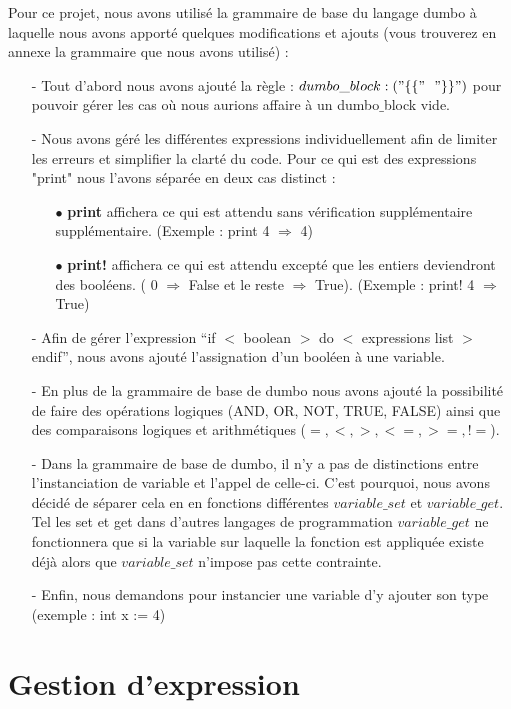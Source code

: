 \documentclass[a4paper, 12pt]{article}
\begin{document}
Pour ce projet, nous avons utilisé la grammaire de base du langage dumbo à laquelle nous avons apporté quelques modifications et ajouts (vous trouverez en annexe la grammaire que nous avons utilisé) : \begin{itemize}
	\item[-] Tout d'abord nous avons ajouté la règle : $dumbo\_block: ( "\{\{"\ \ "\}\}" )$ pour pouvoir gérer les cas où nous aurions affaire à un dumbo$\_$block vide.
	\item[-] Nous avons géré les différentes expressions individuellement afin de limiter les erreurs et simplifier la clarté du code. Pour ce qui est des expressions "print" nous l'avons séparée en deux cas distinct :\begin{itemize}
		\item[$\bullet$] \textbf{print} affichera ce qui est attendu sans vérification supplémentaire supplémentaire. (Exemple : print 4 $\Rightarrow$ 4)
		\item[$\bullet$] \textbf{print!} affichera ce qui est attendu excepté que les entiers deviendront des booléens. ( 0 $\Rightarrow$ False et le reste $\Rightarrow$ True). (Exemple : print! 4 $\Rightarrow$ True)	
	\end{itemize}
	\item[-] Afin de gérer l'expression “if $<$ boolean $>$ do $<$ expressions list $>$ endif”, nous avons ajouté l'assignation d'un booléen à une variable.
	\item[-] En plus de la grammaire de base de dumbo nous avons ajouté la possibilité de faire des opérations logiques (AND, OR, NOT, TRUE, FALSE) ainsi que des comparaisons logiques et arithmétiques ($ =, <, >, <=, >=, !=$).
	\item[-] Dans la grammaire de base de dumbo, il n'y a pas de distinctions entre l'instanciation de variable et l'appel de celle-ci. C'est pourquoi, nous avons décidé de séparer cela en en fonctions différentes $\textit{variable\_set}$ et $\textit{variable\_get}$. Tel les set et get dans d'autres langages de programmation $\textit{variable\_get}$ ne fonctionnera que si la variable sur laquelle la fonction est appliquée existe déjà alors que $\textit{variable\_set}$ n'impose pas cette contrainte.
	\item[-] Enfin, nous demandons pour instancier une variable d'y ajouter son type (exemple : int x := 4)
\end{itemize}

\section{Gestion d'expression}
\end{document}
